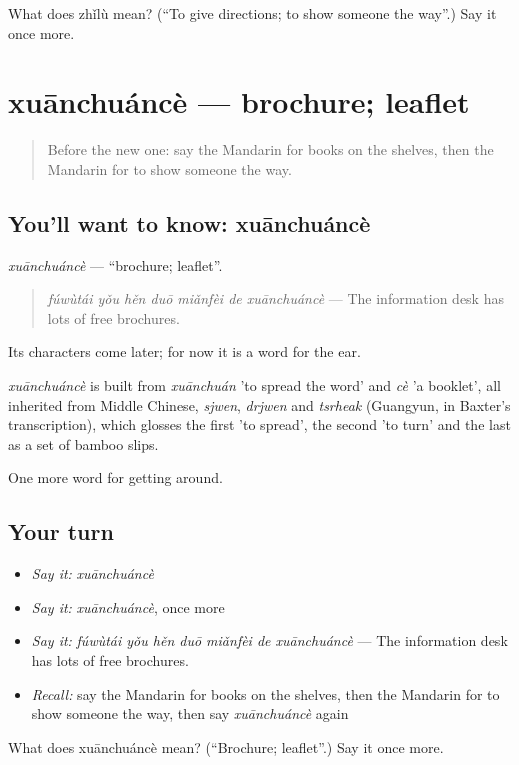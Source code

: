 \begin{tcolorbox}[breakable,colback=teal!4,colframe=teal!35!black,title={Before you move on}]
What does zhǐlù mean? (\textquotedblleft{}To give directions; to show someone the way\textquotedblright{}.) Say it once more.
\end{tcolorbox}
\section[xuānchuáncè]{xuānchuáncè — brochure; leaflet}

\label{lesson:ZH-C454-xuanchuance}



\begin{quote}
Before the new one: say the Mandarin for books on the shelves, then the Mandarin for to show someone the way.
\end{quote}

\subsection*{You'll want to know: xuānchuáncè}
\emph{xuānchuáncè} — \textquotedblleft{}brochure; leaflet\textquotedblright{}.

\begin{quote}
\emph{fúwùtái yǒu hěn duō miǎnfèi de xuānchuáncè} — The information desk has lots of free brochures.
\end{quote}

Its characters come later; for now it is a word for the ear.

\begin{cousinweb}
\emph{xuānchuáncè} is built from \emph{xuānchuán} 'to spread the word' and \emph{cè} 'a booklet', all inherited from Middle Chinese, \emph{sjwen}, \emph{drjwen} and \emph{tsrheak} (Guangyun, in Baxter's transcription), which glosses the first 'to spread', the second 'to turn' and the last as a set of bamboo slips.
\end{cousinweb}

\begin{grammarlens}[title={What you've built}]
One more word for getting around.
\end{grammarlens}

\subsection*{Your turn}
\begin{itemize}
\raggedright
  \item \emph{Say it:} \emph{xuānchuáncè}
  \item \emph{Say it:} \emph{xuānchuáncè}, once more
  \item \emph{Say it:} \emph{fúwùtái yǒu hěn duō miǎnfèi de xuānchuáncè} — The information desk has lots of free brochures.
  \item \emph{Recall:} say the Mandarin for books on the shelves, then the Mandarin for to show someone the way, then say \emph{xuānchuáncè} again
\end{itemize}

\begin{tcolorbox}[breakable,colback=teal!4,colframe=teal!35!black,title={Before you move on}]
What does xuānchuáncè mean? (\textquotedblleft{}Brochure; leaflet\textquotedblright{}.) Say it once more.
\end{tcolorbox}
